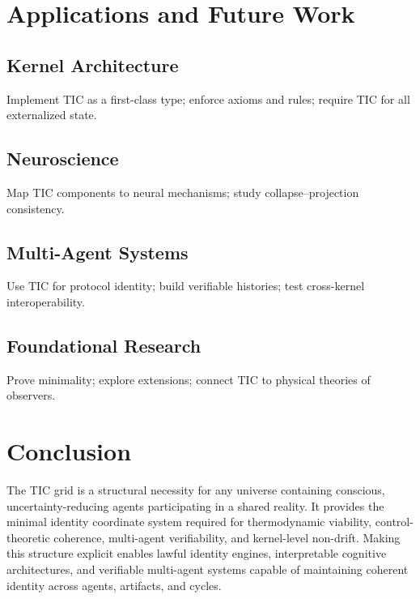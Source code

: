 \documentclass[11pt]{article}
\begin{document}
\section{Applications and Future Work}

\subsection{Kernel Architecture}
Implement TIC as a first-class type; enforce axioms and rules; require TIC for all externalized state.

\subsection{Neuroscience}
Map TIC components to neural mechanisms; study collapse--projection consistency.

\subsection{Multi-Agent Systems}
Use TIC for protocol identity; build verifiable histories; test cross-kernel interoperability.

\subsection{Foundational Research}
Prove minimality; explore extensions; connect TIC to physical theories of observers.

\section{Conclusion}

The TIC grid is a structural necessity for any universe containing conscious, uncertainty-reducing agents participating in a shared reality. It provides the minimal identity coordinate system required for thermodynamic viability, control-theoretic coherence, multi-agent verifiability, and kernel-level non-drift. Making this structure explicit enables lawful identity engines, interpretable cognitive architectures, and verifiable multi-agent systems capable of maintaining coherent identity across agents, artifacts, and cycles.
\end{document}
